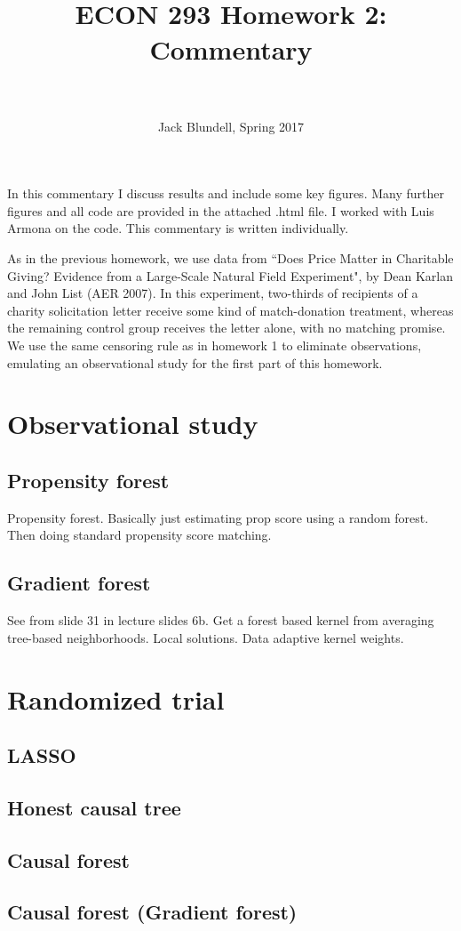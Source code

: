 \documentclass[paper=letter, fontsize=11pt]{scrartcl} %
\title{	
\normalfont \normalsize 
\horrule{0.5pt} \\[0.4cm] %
 \large{{\textbf{ECON 293 Homework 2: Commentary}}} \\ %
\horrule{2pt} \\[0.5cm] %
}
\author{\small{Jack Blundell, Spring 2017}} %
\date{} %
\begin{document}
\maketitle %

In this commentary I discuss results and include some key figures. Many further figures and all code are provided in the attached .html file. I worked with Luis Armona on the code. This commentary is written individually.

As in the previous homework, we use data from ``Does Price Matter in Charitable Giving? Evidence from a Large-Scale Natural Field Experiment", by Dean Karlan and John List (AER 2007). In this experiment, two-thirds of recipients of a charity solicitation letter receive some kind of match-donation treatment, whereas the remaining control group receives the letter alone, with no matching promise. We use the same censoring rule as in homework 1 to eliminate observations, emulating an observational study for the first part of this homework.

\section{Observational study}

\subsection{Propensity forest}

Propensity forest. Basically just estimating prop score using a random forest. Then doing standard propensity score matching. 

\subsection{Gradient forest}

See from slide 31 in lecture slides 6b. Get a forest based kernel from averaging tree-based neighborhoods. Local solutions. Data adaptive kernel weights.

\section{Randomized trial}

\subsection{LASSO}

\subsection{Honest causal tree}

\subsection{Causal forest}

\subsection{Causal forest (Gradient forest)}
\end{document}
